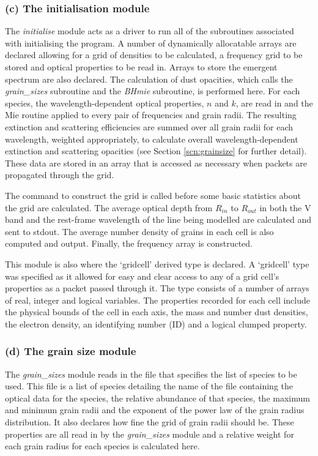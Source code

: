         \subsubsection{(c) The initialisation module}
        The \textit{initialise} module acts as a driver to run all of the subroutines associated with initialising the program.  A number of dynamically allocatable arrays are declared allowing for a grid of densities to be calculated, a frequency grid to be stored and optical properties to be read in.  Arrays to store the emergent spectrum are also declared.  The calculation of dust opacities, which calls the \textit{grain\_sizes} subroutine and the \textit{BHmie} subroutine, is performed here.  For each species, the wavelength-dependent optical properties, $n$ and $k$, are read in and the Mie routine applied to every pair of frequencies and grain radii.  The resulting extinction and scattering efficiencies are summed over all grain radii for each wavelength, weighted appropriately, to calculate overall wavelength-dependent extinction and scattering opacities (see Section \ref{scn:grainsize} for further detail).  These data are stored in an array that is accessed as necessary when packets are propagated through the grid.   
        
        The command to construct the grid is called before some basic statistics about the grid are calculated.  The average optical depth from $R_{in}$ to $R_{out}$ in both the V band and the rest-frame wavelength of the line being modelled are calculated and sent to stdout.  The average number density of grains in each cell is also computed and output.  Finally, the frequency array is constructed.
        
        This module is also where the `gridcell' derived type is declared.  A `gridcell' type was specified as it allowed for easy and clear access to any of a grid cell's properties as a packet passed through it.  The type consists of a number of arrays of real, integer and logical variables.  The properties recorded for each cell include the physical bounds of the cell in each axis, the mass and number dust densities,  the electron density, an identifying number (ID) and a logical clumped property. 
        
        \subsubsection{(d) The grain size module}
        The \textit{grain\_sizes} module reads in the file that specifies the list of species to be used.  This file is a list of species detailing the name of the file containing the optical data for the species, the relative abundance of that species, the maximum and minimum grain radii and the exponent of the power law of the grain radius distribution.  It also declares how fine the grid of grain radii should be.  These properties are all read in by the \textit{grain\_sizes} module and a relative weight for each grain radius for each species is calculated here.
        
